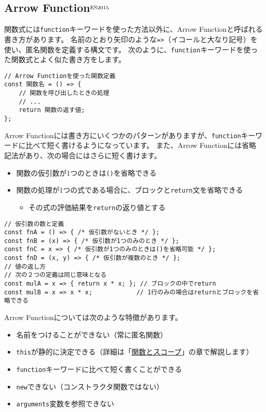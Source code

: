 \hypertarget{arrow-function}{%
\subsection{Arrow Function{$^{\rm ES2015}$}}\label{arrow-function}}

関数式には\texttt{function}キーワードを使った方法以外に、Arrow
Functionと呼ばれる書き方があります。
名前のとおり矢印のような\texttt{=>}（イコールと大なり記号）を使い、匿名関数を定義する構文です。
次のように、\texttt{function}キーワードを使った関数式とよく似た書き方をします。

\begin{lstlisting}
// Arrow Functionを使った関数定義
const 関数名 = () => {
    // 関数を呼び出したときの処理
    // ...
    return 関数の返す値;
};
\end{lstlisting}

Arrow
Functionには書き方にいくつかのパターンがありますが、\texttt{function}キーワードに比べて短く書けるようになっています。
また、Arrow Functionには省略記法があり、次の場合にはさらに短く書けます。

\begin{itemize}
\item
  関数の仮引数が1つのときは\texttt{()}を省略できる
\item
  関数の処理が1つの式である場合に、ブロックと\texttt{return}文を省略できる

  \begin{itemize}
  \item
    その式の評価結果を\texttt{return}の返り値とする
  \end{itemize}
\end{itemize}

\begin{lstlisting}
// 仮引数の数と定義
const fnA = () => { /* 仮引数がないとき */ };
const fnB = (x) => { /* 仮引数が1つのみのとき */ };
const fnC = x => { /* 仮引数が1つのみのときは()を省略可能 */ };
const fnD = (x, y) => { /* 仮引数が複数のとき */ };
// 値の返し方
// 次の２つの定義は同じ意味となる
const mulA = x => { return x * x; }; // ブロックの中でreturn
const mulB = x => x * x;            // 1行のみの場合はreturnとブロックを省略できる
\end{lstlisting}

Arrow Functionについては次のような特徴があります。

\begin{itemize}
\item
  名前をつけることができない（常に匿名関数）
\item
  \texttt{this}が静的に決定できる（詳細は「\href{../function-scope/README.md}{関数とスコープ}」の章で解説します）
\item
  \texttt{function}キーワードに比べて短く書くことができる
\item
  \texttt{new}できない（コンストラクタ関数ではない）
\item
  \texttt{arguments}変数を参照できない
\end{itemize}


